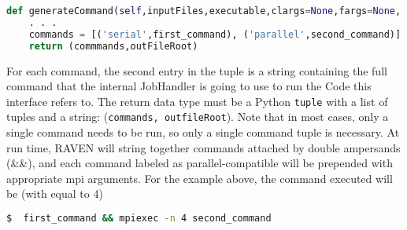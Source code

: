 \begin{lstlisting}[language=python]
  def generateCommand(self,inputFiles,executable,clargs=None,fargs=None, preExec=None):
    . . .
    commands = [('serial',first_command), ('parallel',second_command)]
    return (commmands,outFileRoot)
\end{lstlisting}
For each command, the second entry in the tuple is a string containing the full command
that the internal JobHandler is going to use to run the Code this interface refers to.
The return data type must be a Python \texttt{tuple} with a list of tuples and a string: (\texttt{commands, outfileRoot}).
Note that in most cases, only a single command needs to be run, so only a single command tuple is necessary.
At run time, RAVEN will string together commands attached by double ampersands (\&\&), and each command
labeled as parallel-compatible will be prepended with appropriate mpi arguments.  For the example above, the
command executed will be (with  equal to 4)

\begin{lstlisting}[language=bash]
$  first_command && mpiexec -n 4 second_command
\end{lstlisting}

